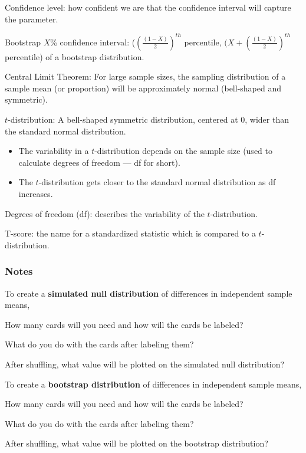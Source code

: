 \documentclass[
]{report}
\providecommand{\tightlist}{%
  \setlength{\itemsep}{0pt}\setlength{\parskip}{0pt}}
\newcommand{\rgs}{\vspace{12pt}} %
\newcommand{\rgi}{\hspace{24pt}}  %
\begin{document}
Confidence level: how confident we are that the confidence interval will capture the parameter.

Bootstrap \(X\)\% confidence interval: (\((\frac{(1-X)}{2})^{th}\) percentile, \((X+(\frac{(1-X)}{2})^{th}\) percentile) of a bootstrap distribution.

Central Limit Theorem: For large sample sizes, the sampling distribution of a sample mean (or proportion) will be approximately normal (bell-shaped and symmetric).

\(t\)-distribution: A bell-shaped symmetric distribution, centered at 0, wider than the standard normal distribution.

\begin{itemize}
\tightlist
\item
  The variability in a \(t\)-distribution depends on the sample size (used to calculate degrees of freedom --- df for short).
\item
  The \(t\)-distribution gets closer to the standard normal distribution as df increases.
\end{itemize}

Degrees of freedom (df): describes the variability of the \(t\)-distribution.

T-score: the name for a standardized statistic which is compared to a \(t\)-distribution.

\hypertarget{notes-4}{%
\subsubsection*{Notes}\label{notes-4}}

To create a \textbf{simulated null distribution} of differences in independent sample means,

\rgi How many cards will you need and how will the cards be labeled?
\rgs

\rgi What do you do with the cards after labeling them?
\rgs

\rgi After shuffling, what value will be plotted on the simulated null distribution?
\rgs

To create a \textbf{bootstrap distribution} of differences in independent sample means,

\rgi How many cards will you need and how will the cards be labeled?
\rgs

\rgi What do you do with the cards after labeling them?
\rgs

\rgi After shuffling, what value will be plotted on the bootstrap distribution?
\rgs
\end{document}
